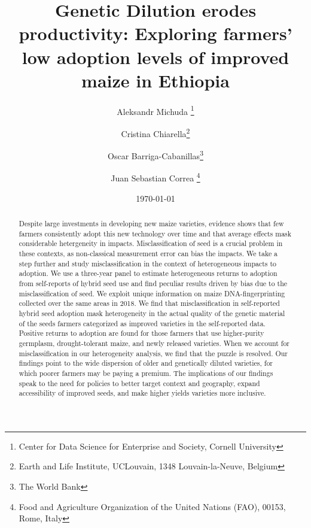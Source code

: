 \documentclass[11pt]{article}
\begin{document}
    \begin{titlepage}
    
    \title{Genetic Dilution erodes productivity: Exploring farmers' low adoption levels of improved maize in  Ethiopia}


\author{%
 Aleksandr Michuda \footnote{Center for Data Science for Enterprise and Society, Cornell University}%
 \and Cristina Chiarella\footnote{Earth and Life Institute, UCLouvain, 1348 Louvain-la-Neuve, Belgium}%
 \and Oscar Barriga-Cabanillas\footnote{The World Bank}%
  \and Juan Sebastian Correa \footnote{Food and Agriculture Organization of the United Nations (FAO), 00153, Rome, Italy}%
  }

	\date{\today}

    \clearpage\maketitle
	\thispagestyle{empty}
	\vspace*{-2em}
    \begin{center}\begin{abstract}
    \singlespacing
			\noindent  
			Despite large investments in  developing new  maize varieties, evidence shows that few farmers consistently adopt this new technology over time and that average effects mask considerable hetergeneity in impacts. Misclassification of seed is a crucial problem in these contexts, as non-classical measurement error can bias the impacts. We take a step further and study misclassification in the context of heterogeneous impacts to adoption. We use a three-year panel to estimate heterogeneous returns to adoption from self-reports of hybrid seed use and find peculiar results driven by bias due to the misclassification of seed. We exploit unique information on maize DNA-fingerprinting collected over the same areas in 2018. We find that misclassification in self-reported hybrid seed adoption mask heterogeneity in the actual quality of the genetic material of the seeds farmers categorized as improved varieties in the self-reported data. Positive returns to adoption are found for those farmers that use higher-purity germplasm, drought-tolerant maize, and newly released varieties. When we account for misclassification in our heterogeneity analysis, we find that the puzzle is resolved. Our findings point to the wide dispersion of older and genetically diluted varieties, for which poorer farmers may be paying a premium. The implications of our findings speak to the need for policies to better target context and geography, expand accessibility of improved seeds, and make higher yields varieties more inclusive.
			

\end{abstract}
\end{center}
\end{titlepage}
\end{document}
